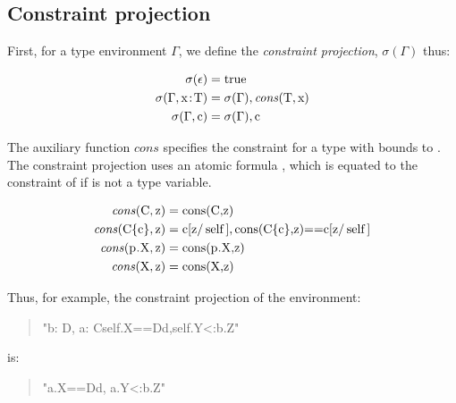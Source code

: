 \documentclass[preprint,nocopyrightspace,9pt]{sigplanconf}
\begin{document}
\subsection{
Constraint projection
}

First, for a type environment $\Gamma$,
we define the \emph{constraint projection},
$\sigma(\Gamma)$ thus:

\begin{align*}
\sigma(\epsilon) &= \Xcd{true} \\
\sigma(\Gamma, \Xcd{x} \ty \Xcd{T}) &=
        \sigma(\Gamma),
        \cons{\Xcd{T}}{\Xcd{x}}
\\
\sigma(\Gamma, \Xcd{c}) &= \sigma(\Gamma), \Xcd{c} \\
\end{align*}

The auxiliary function $\mathit{cons}$
specifies the constraint for a type  with 
bounds to .
The constraint projection uses an atomic formula ,
which is equated to the constraint of  if  is not
a type variable.

\begin{align*}
\cons{\Xcd{C}}{\Xcd{z}} &=
    \Xcd{cons(C,z)} \\
\cons{\Xcd{C\{c\}}}{\Xcd{z}} &=
    \Xcd{c}[\Xcd{z}/\Xcd{self}], \Xcd{cons(C\{c\},z)==c}[\Xcd{z}/\Xcd{self}] \\
\cons{\Xcd{p.X}}{\Xcd{z}} &=
    \Xcd{cons(p.X,z)} \\
\cons{\Xcd{X}}{\Xcd{z}} &=
    \Xcd{cons(X,z)} \\
\end{align*}

\noindent
Thus, for example, the constraint projection of the environment:
\begin{quote}
\xcdmath"b: D, a: C{self.X==D{d},self.Y<:b.Z}"
\end{quote}
\noindent is:
\begin{quote}
\xcdmath"a.X==D{d}, a.Y<:b.Z" \\
\end{quote}
\end{document}

